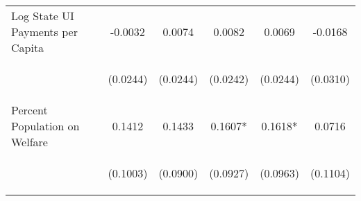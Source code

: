 \begin{center}
\begin{tabular}{lccccc}
\noalign{\smallskip}Log State UI Payments per Capita & \begin{scriptsize}-0.0032\end{scriptsize} & \begin{scriptsize}0.0074\end{scriptsize} & \begin{scriptsize}0.0082\end{scriptsize} & \begin{scriptsize}0.0069\end{scriptsize} & \begin{scriptsize}-0.0168\end{scriptsize}\\
 & \begin{scriptsize}(0.0244)\end{scriptsize} & \begin{scriptsize}(0.0244)\end{scriptsize} & \begin{scriptsize}(0.0242)\end{scriptsize} & \begin{scriptsize}(0.0244)\end{scriptsize} & \begin{scriptsize}(0.0310)\end{scriptsize}\\
\noalign{\smallskip}Percent Population on Welfare & \begin{scriptsize}0.1412\end{scriptsize} & \begin{scriptsize}0.1433\end{scriptsize} & \begin{scriptsize}0.1607*\end{scriptsize} & \begin{scriptsize}0.1618*\end{scriptsize} & \begin{scriptsize}0.0716\end{scriptsize}\\
 & \begin{scriptsize}(0.1003)\end{scriptsize} & \begin{scriptsize}(0.0900)\end{scriptsize} & \begin{scriptsize}(0.0927)\end{scriptsize} & \begin{scriptsize}(0.0963)\end{scriptsize} & \begin{scriptsize}(0.1104)\end{scriptsize}\\

\end{tabular}
\end{center}
